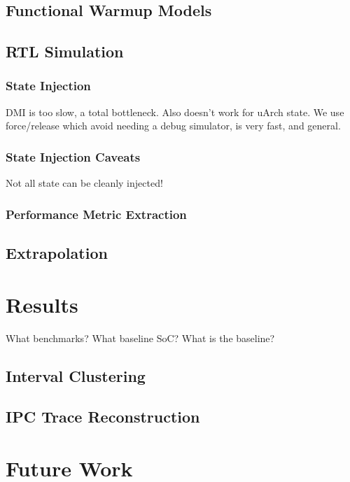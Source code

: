 \documentclass[sigplan,nonacm,10pt]{acmart}
\begin{document}
\subsection{Functional Warmup Models}

\subsection{RTL Simulation}

\subsubsection{State Injection}

DMI is too slow, a total bottleneck. Also doesn't work for uArch state.
We use force/release which avoid needing a debug simulator, is very fast, and general.

\subsubsection{State Injection Caveats}

Not all state can be cleanly injected!

\subsubsection{Performance Metric Extraction}

\subsection{Extrapolation}

\section{Results}

What benchmarks?
What baseline SoC?
What is the baseline?

\subsection{Interval Clustering}

\subsection{IPC Trace Reconstruction}

\section{Future Work}
\end{document}
